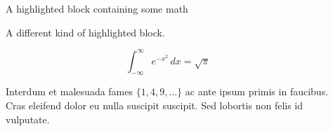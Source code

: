 \documentclass[final]{beamer}
\newlength{\sepwidth}
\newlength{\colwidth}
\newcommand{\separatorcolumn}{\begin{column}{\sepwidth}\end{column}}
\begin{document}
\begin{frame}[t]
\begin{columns}[t]
\begin{column}{\colwidth}



		\end{column}

		\separatorcolumn

		\begin{column}{\colwidth}

			\begin{exampleblock}{A highlighted block containing some math}

				A different kind of highlighted block.

				$$
					\int_{-\infty}^{\infty} e^{-x^2}\,dx = \sqrt{\pi}
				$$

				Interdum et malesuada fames $\{1, 4, 9, \ldots\}$ ac ante ipsum primis in
				faucibus. Cras eleifend dolor eu nulla suscipit suscipit. Sed lobortis non
				felis id vulputate.


\end{exampleblock}
\end{column}
\end{columns}
\end{frame}
\end{document}
